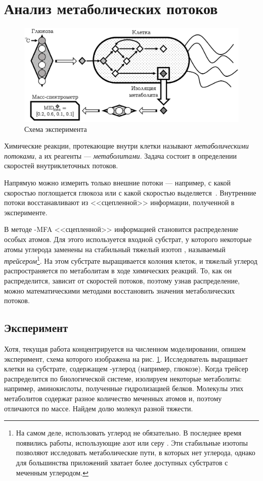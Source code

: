 \documentclass[14pt, a4paper]{extreport}
\begin{document}
	\section{Анализ метаболических потоков}
\begin{figure}[t]
	\includegraphics[width=1\textwidth]{experiment.png}\par
	\caption{Схема эксперимента}
	\label{experiment}
\end{figure}
Химические реакции, протекающие внутри клетки называют \emph{метаболическими потоками}, а их реагенты --- \emph{метаболитами}. Задача состоит в определении скоростей внутриклеточных потоков. 

Напрямую можно измерить только внешние потоки --- например, с какой скоростью поглощается глюкоза или с какой скоростью выделяется~. Внутренние потоки восстанавливают из <<сцепленной>> информации, полученной в эксперименте. 

В методе -MFA <<сцепленной>> информацией становится распределение особых атомов\cite{shupltesov_review_2}. Для этого используется входной субстрат, у которого некоторые атомы углерода заменены на стабильный тяжелый изотоп , называемый \emph{трейсером}\footnote{На самом деле, использовать углерод не обязательно. В последнее время появились работы, использующие  азот \cite{nitrogen_mfa} или  серу \cite{sulfur_mfa}. Эти стабильные изотопы позволяют исследовать метаболические пути, в которых нет углерода, однако для большинства приложений хватает более доступных субстратов с меченным углеродом.}.
На этом субстрате выращивается колония клеток, и тяжелый углерод распространяется по метаболитам в ходе химических реакций. То, как он распределится, зависит от скоростей потоков, поэтому узнав распределение, можно математическими методами восстановить значения метаболических потоков.



\subsection{Эксперимент}
Хотя, текущая работа концентрируется на численном моделировании, опишем эксперимент\cite[стр. 312]{protocol}, схема которого изображена на рис. \ref{experiment}. Исследователь выращивает клетки на субстрате, содержащем -углерод (например, глюкозе). Когда трейсер распределится по биологической системе, изолируем некоторые метаболиты: например, аминокислоты, полученные гидролизацией белков. Молекулы этих метаболитов содержат разное количество меченных атомов и, поэтому отличаются по массе. Найдем долю молекул разной тяжести. 
\end{document}
